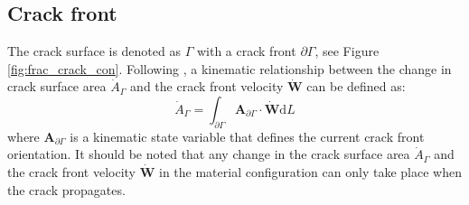 \documentclass[11pt]{ACMEarticle}
\numberwithin{equation}{section}
\begin{document}
\subsection{Crack front}
The crack surface is denoted as $\Gamma$ with a crack front $\partial \Gamma$, see Figure \ref{fig:frac_crack_con}.  Following \citep{kaczmarczyk2014three}, a kinematic relationship between the change in crack surface area $\dot A_\Gamma$ and the crack front velocity $\mathbf{\dot W}$ can be defined as:
\begin{equation}\label{eq:crack_front}
\dot A_\Gamma = \int_{\partial \Gamma} \mathbf A_{\partial \Gamma} \cdot \mathbf{ \dot W} \mathrm d L 
\end{equation}
where $ \mathbf A_{\partial \Gamma}$ is a kinematic state variable that defines the current crack front orientation. It should be noted that any change in the crack surface area $\dot A_\Gamma $ and the crack front velocity $\mathbf {\dot W}$ in the material configuration can only take place when the crack propagates. 
\end{document}
